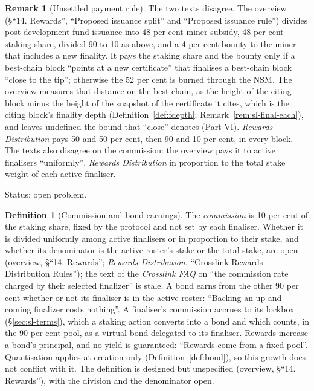 \documentclass[11pt,a4paper]{article}
\theoremstyle{definition}
\newtheorem{definition}[theorem]{Definition}
\newtheorem{remark}[theorem]{Remark}
\begin{document}
\begin{remark}[Unsettled payment rule]\label{rem:payment-open}
The two texts disagree. The overview (\S``14. Rewards'', ``Proposed issuance
split'' and ``Proposed issuance rule'') divides post-development-fund
issuance into 48 per cent miner subsidy, 48 per cent staking share, divided
90 to 10 as above, and a 4 per cent bounty to the miner that includes a new
finality. It pays the staking share and the bounty only if a best-chain
block ``points at a new certificate'' that finalises a best-chain block
``close to the tip''; otherwise the 52 per cent is burned through the NSM.
The overview measures that distance on the best chain, as the height of the
citing block minus the height of the snapshot of the certificate it cites,
which is the citing block's finality depth (Definition~\ref{def:fdepth};
Remark~\ref{rem:sl-final-each}), and leaves undefined the bound that
``close'' denotes (Part VI). \emph{Rewards Distribution} pays 50 and 50 per
cent, then 90 and 10 per cent, in every block. The texts also disagree on
the commission: the overview pays it to active finalisers ``uniformly'',
\emph{Rewards Distribution} in proportion to the total stake weight of each
active finaliser.

Status: open problem.
\end{remark}

\begin{definition}[Commission and bond earnings]\label{def:commission}
The \emph{commission} is 10 per cent of the staking share, fixed by the
protocol and not set by each finaliser. Whether it is divided uniformly
among active finalisers or in proportion to their stake, and whether its
denominator is the active roster's stake or the total stake, are open
(overview, \S``14. Rewards''; \emph{Rewards Distribution}, ``Crosslink Rewards
Distribution Rules''); the text of the \emph{Crosslink FAQ} on ``the
commission rate charged by their selected finalizer'' is stale. A bond earns
from the other 90 per cent whether or not its finaliser is in the active
roster: ``Backing an up-and-coming finalizer costs nothing''. A finaliser's
commission accrues to its lockbox (\S\ref{sec:sl-terms}), which a staking
action converts into a bond and which counts, in the 90 per cent pool, as a
virtual bond delegated to its finaliser. Rewards increase a bond's
principal, and no yield is guaranteed: ``Rewards come from a fixed pool''.
Quantisation applies at creation only (Definition~\ref{def:bond}), so this
growth does not conflict with it. The definition is designed but unspecified
(overview, \S``14. Rewards''), with the division and the denominator open.
\end{definition}
\end{document}
